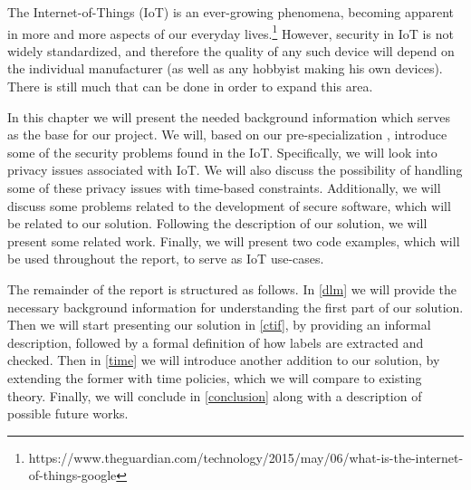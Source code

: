 
The Internet-of-Things (IoT) is an ever-growing phenomena, becoming apparent in more and more aspects of our everyday lives.\footnote{https://www.theguardian.com/technology/2015/may/06/what-is-the-internet-of-things-google}
However, security in IoT is not widely standardized, and therefore the quality of any such device will depend on the individual manufacturer (as well as any hobbyist making his own devices).
There is still much that can be done in order to expand this area.

In this chapter we will present the needed background information which serves as the base for our project.
We will, based on our pre-specialization \cite{prespecialization}, introduce some of the security problems found in the IoT.
Specifically, we will look into privacy issues associated with IoT.
We will also discuss the possibility of handling some of these privacy issues with time-based constraints.
Additionally, we will discuss some problems related to the development of secure software, which will be related to our solution.
Following the description of our solution, we will present some related work.
Finally, we will present two code examples, which will be used throughout the report, to serve as IoT use-cases.

The remainder of the report is structured as follows.
In \cref{dlm} we will provide the necessary background information for understanding the first part of our solution.
Then we will start presenting our solution in \cref{ctif}, by providing an informal description, followed by a formal definition of how labels are extracted and checked.
Then in \cref{time} we will introduce another addition to our solution, by extending the former with time policies, which we will compare to existing theory.
Finally, we will conclude in \cref{conclusion} along with a description of possible future works.

